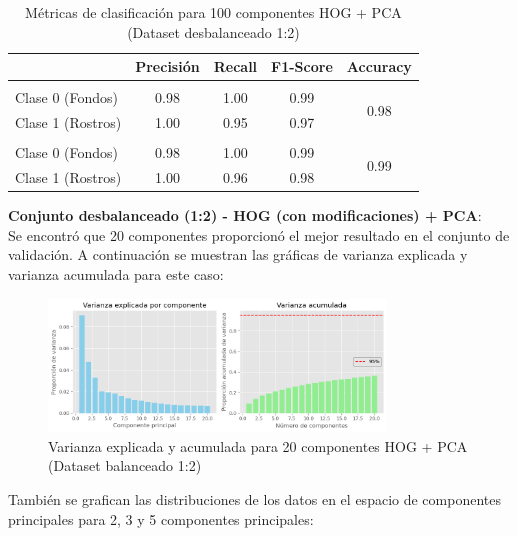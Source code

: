 \documentclass{article}
\begin{document}
\begin{table}[H]
    \centering
    \begin{tabular}{|>{\centering\arraybackslash}m{3.2cm}|c|c|c|c|}
    \hline
    \rowcolor{tableblue} \multicolumn{1}{|c|}{\textbf{Conjunto}} & \textbf{Precisión} & \textbf{Recall} & \textbf{F1-Score} & \textbf{Accuracy} \\
    \hline
    \multicolumn{5}{|c|}{\textbf{Entrenamiento}} \\
    \hline
    Clase 0 (Fondos) & 0.98 & 1.00 & 0.99 & \multirow{2}{*}{0.98} \\
    Clase 1 (Rostros) & 1.00 & 0.95 & 0.97 & \\
    \hline
    \multicolumn{5}{|c|}{\textbf{Validación}} \\
    \hline
    Clase 0 (Fondos) & 0.98 & 1.00 & 0.99 & \multirow{2}{*}{0.99} \\
    Clase 1 (Rostros) & 1.00 & 0.96 & 0.98 & \\
    \hline
    \end{tabular}
    \caption{Métricas de clasificación para 100 componentes HOG + PCA (Dataset desbalanceado 1:2)}
    \label{tab:hog_pca_x1_metrics}
\end{table}

\textbf{Conjunto desbalanceado (1:2) - HOG (con modificaciones) + PCA}:\\

Se encontró que 20 componentes proporcionó el mejor resultado en el conjunto de validación. A continuación se muestran las gráficas de varianza explicada y varianza acumulada para este caso:

\begin{figure}[H]
    \centering
    \includegraphics[width=0.8\textwidth]{tarea_4/imagenes/variance_x1_v1_20.png}
    \caption{Varianza explicada y acumulada para 20 componentes HOG + PCA (Dataset balanceado 1:2)}
    \label{fig:hog_pca_variance_x1}
\end{figure}

También se grafican las distribuciones de los datos en el espacio de componentes principales para 2, 3 y 5 componentes principales:
\end{document}
